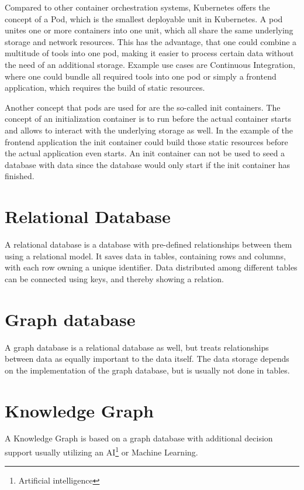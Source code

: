 Compared to other container orchestration systems, Kubernetes offers the concept of a Pod, which is the smallest deployable unit in Kubernetes. A pod unites one or more containers into one unit, which all share the same underlying storage and network resources. This has the advantage, that one could combine a multitude of tools into one pod, making it easier to process certain data without the need of an additional storage. Example use cases are Continuous Integration, where one could bundle all required tools into one pod or simply a frontend application, which requires the build of static resources.

Another concept that pods are used for are the so-called init containers. The concept of an initialization container is to run before the actual container starts and allows to interact with the underlying storage as well. In the example of the frontend application the init container could build those static resources before the actual application even starts. An init container can not be used to seed a database with data since the database would only start if the init container has finished.

\section{Relational Database}
A relational database is a database with pre-defined relationships between them using a relational model. It saves data in tables, containing rows and columns, with each row owning a unique identifier. Data distributed among different tables can be connected using keys, and thereby showing a relation.
\section{Graph database}
A graph database is a relational database as well, but treats relationships between data as equally important to the data itself. The data storage depends on the implementation of the graph database, but is usually not done in tables.
\section{Knowledge Graph}
A Knowledge Graph is based on a graph database with additional decision support usually utilizing an AI\footnote{Artificial intelligence} or Machine Learning.

